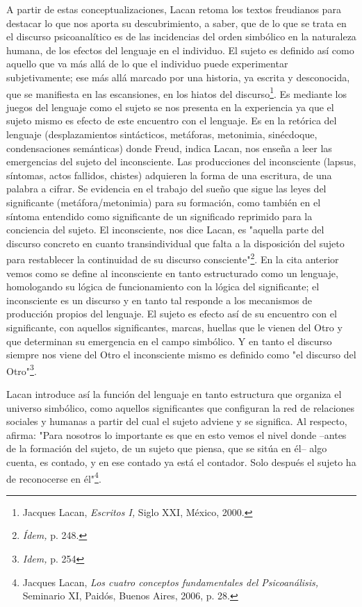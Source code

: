 A partir de estas conceptualizaciones, Lacan retoma los textos
freudianos para destacar lo que nos aporta su descubrimiento, a saber,
que de lo que se trata en el discurso psicoanalítico es de las
incidencias del orden simbólico en la naturaleza humana, de los efectos
del lenguaje en el individuo. El sujeto es definido así como aquello que
va más allá de lo que el individuo puede experimentar subjetivamente;
ese más allá marcado por una historia, ya escrita y desconocida, que se
manifiesta en las escansiones, en los hiatos del discurso\footnote{Jacques
  Lacan, \emph{Escritos I,} Siglo XXI, México, 2000.}. Es mediante los
juegos del lenguaje como el sujeto se nos presenta en la experiencia ya
que el sujeto mismo es efecto de este encuentro con el lenguaje. Es en
la retórica del lenguaje (desplazamientos sintácticos, metáforas,
metonimia, sinécdoque, condensaciones semánticas) donde Freud, indica
Lacan, nos enseña a leer las emergencias del sujeto del inconsciente.
Las producciones del inconsciente (lapsus, síntomas, actos fallidos,
chistes) adquieren la forma de una escritura, de una palabra a cifrar.
Se evidencia en el trabajo del sueño que sigue las leyes del
significante (metáfora/metonimia) para su formación, como también en el
síntoma entendido como significante de un significado reprimido para la
conciencia del sujeto. El inconsciente, nos dice Lacan, es "aquella
parte del discurso concreto en cuanto transindividual que falta a la
disposición del sujeto para restablecer la continuidad de su discurso
consciente"\footnote{\emph{Ídem,} p. 248.}. En la cita anterior vemos
como se define al inconsciente en tanto estructurado como un lenguaje,
homologando su lógica de funcionamiento con la lógica del significante;
el inconsciente es un discurso y en tanto tal responde a los mecanismos
de producción propios del lenguaje. El sujeto es efecto así de su
encuentro con el significante, con aquellos significantes, marcas,
huellas que le vienen del Otro y que determinan su emergencia en el
campo simbólico. Y en tanto el discurso siempre nos viene del Otro el
inconsciente mismo es definido como "el discurso del Otro"\footnote{\emph{Idem,}
  p. 254}.

Lacan introduce así la función del lenguaje en tanto estructura que
organiza el universo simbólico, como aquellos significantes que
configuran la red de relaciones sociales y humanas a partir del cual el
sujeto adviene y se significa. Al respecto, afirma: "Para nosotros lo
importante es que en esto vemos el nivel donde --antes de la formación
del sujeto, de un sujeto que piensa, que se sitúa en él-- algo cuenta,
es contado, y en ese contado ya está el contador. Solo después el sujeto
ha de reconocerse en él"\footnote{Jacques Lacan, \emph{Los cuatro
  conceptos fundamentales del Psicoanálisis,} Seminario XI, Paidós,
  Buenos Aires, 2006, p. 28.}.

